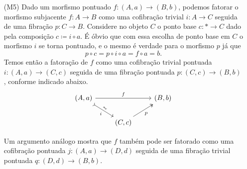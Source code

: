 \begin{exem}
\begin{enumerate}
  \item[(M5)] Dado um morfismo pontuado $f: (A,a) \to (B,b)$, podemos fatorar o morfismo subjacente $f: A \to B$ como uma cofibração trivial $i: A \to C$ seguida de uma fibração $p: C \to B$.
    Considere no objeto $C$ o ponto base $c: * \to C$ dado pela composição $c \coloneqq i \circ a$.
    É óbvio que com essa escolha de ponto base em $C$ o morfismo $i$ se torna pontuado, e o mesmo é verdade para o morfismo $p$ já que
    \begin{displaymath}
      p \circ c = p \circ i \circ a = f \circ a = b.
    \end{displaymath}
    Temos então a fatoração de $f$ como uma cofibração trivial pontuada $i: (A,a) \to (C,c)$ seguida de uma fibração pontuada $p: (C,c) \to (B,b)$, conforme indicado abaixo.
    \begin{displaymath}
      \begin{tikzcd}
        (A,a)
        \arrow[rr, "f"]
        \arrow[rd, tail, "i" {swap}, "\sim" {sloped}]
        & & (B,b)
        \\ & (C,c)
        \arrow[ru, two heads, "p" swap]
      \end{tikzcd}
    \end{displaymath}

    Um argumento análogo mostra que $f$ também pode ser fatorado como uma cofibração pontuada $j: (A,a) \to (D,d)$ seguida de uma fibração trivial pontuada $q: (D,d) \to (B,b)$.
  \end{enumerate}
\end{exem}

